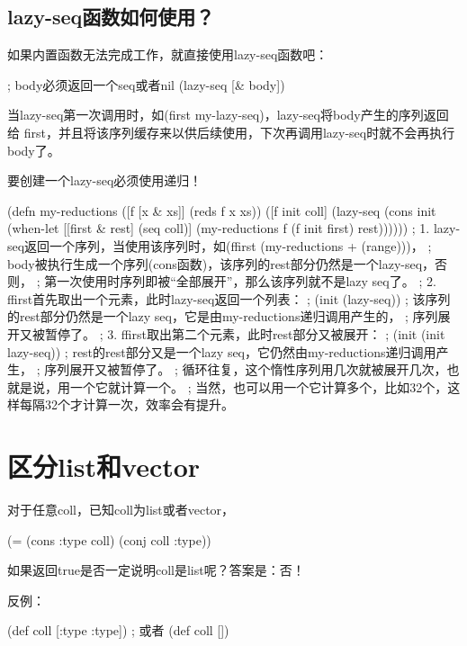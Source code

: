 ﻿\documentclass[a4paper,11pt]{article}
\begin{document}
  \subsection[lazy-seq函数如何使用？]{lazy-seq函数如何使用？}
  如果内置函数无法完成工作，就直接使用lazy-seq函数吧：

  \begin{schemecode}
; body必须返回一个seq或者nil
(lazy-seq
  [& body])
  \end{schemecode}
  
  当lazy-seq第一次调用时，如(first my-lazy-seq)，lazy-seq将body产生的序列返回给
  first，并且将该序列缓存来以供后续使用，下次再调用lazy-seq时就不会再执行body了。

  要创建一个lazy-seq必须使用递归！

  \begin{schemecode}
(defn my-reductions
  ([f [x & xs]] (reds f x xs))
  ([f init coll]
     (lazy-seq
      (cons init
            (when-let [[first & rest] (seq coll)]
              (my-reductions f (f init first) rest))))))
; 1. lazy-seq返回一个序列，当使用该序列时，如(ffirst (my-reductions + (range)))，
;    body被执行生成一个序列(cons函数)，该序列的rest部分仍然是一个lazy-seq，否则，
;    第一次使用时序列即被“全部展开”，那么该序列就不是lazy seq了。
; 2. ffirst首先取出一个元素，此时lazy-seq返回一个列表：
;      (init (lazy-seq))
;    该序列的rest部分仍然是一个lazy seq，它是由my-reductions递归调用产生的，
;    序列展开又被暂停了。
; 3. ffirst取出第二个元素，此时rest部分又被展开：
;      (init (init lazy-seq))
;    rest的rest部分又是一个lazy seq，它仍然由my-reductions递归调用产生，
;    序列展开又被暂停了。
; 循环往复，这个惰性序列用几次就被展开几次，也就是说，用一个它就计算一个。
; 当然，也可以用一个它计算多个，比如32个，这样每隔32个才计算一次，效率会有提升。
  \end{schemecode}
  
  \section[区分list和vector]{区分list和vector}
  对于任意coll，已知coll为list或者vector，

  \begin{schemecode}
(= (cons :type coll) (conj coll :type))
  \end{schemecode}

  如果返回true是否一定说明coll是list呢？答案是：否！

  反例：\par
  \begin{schemecode}
(def coll
  [:type :type])
; 或者
(def coll
  [])
  \end{schemecode}
\end{document}

